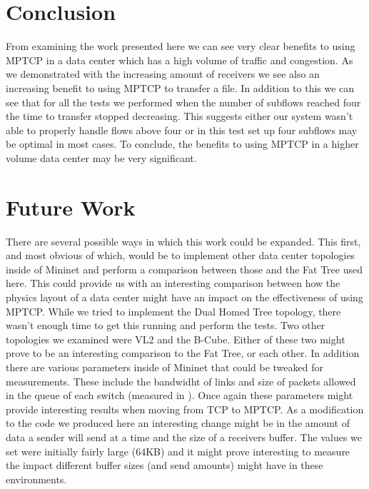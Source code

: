 \documentclass[10pt]{report}
\begin{document}
\section{Conclusion}
From examining the work presented here we can see very clear benefits
to using MPTCP in a data center which has a high volume of traffic and
congestion. As we demonstrated with the increasing amount of receivers
we see also an increasing benefit to using MPTCP to transfer a
file. In addition to this we can see that for all the tests we
performed when the number of subflows reached four the time to
transfer stopped decreasing. This suggests either our system wasn't
able to properly handle flows above four or in this test set up four
subflows may be optimal in most cases. To conclude, the benefits to
using MPTCP in a higher volume data center may be very significant.

\section{Future Work}
There are several possible ways in which this work could be
expanded. This first, and most obvious of which, would be to implement
other data center topologies inside of Mininet and perform a
comparison between those and the Fat Tree used here. This could
provide us with an interesting comparison between how the physics
layout of a data center might have an impact on the effectiveness of
using MPTCP. While we tried to implement the Dual Homed Tree topology,
there wasn't enough time to get this running and perform the
tests. Two other topologies we examined were VL2 and the
B-Cube. Either of these two might prove to be an interesting
comparison to the Fat Tree, or each other. In addition there are
various parameters inside of Mininet that could be tweaked for
measurements. These include the bandwidht of links and size of packets
allowed in the queue of each switch (measured in
\cite{datacenter}). Once again these parameters might provide
interesting results when moving from TCP to MPTCP. As a modification
to the code we produced here an interesting change might be in the
amount of data a sender will send at a time and the size of a
receivers buffer. The values we set were initially fairly large (64KB)
and it might prove interesting to measure the impact different buffer
sizes (and send amounts) might have in these environments.
\end{document}
